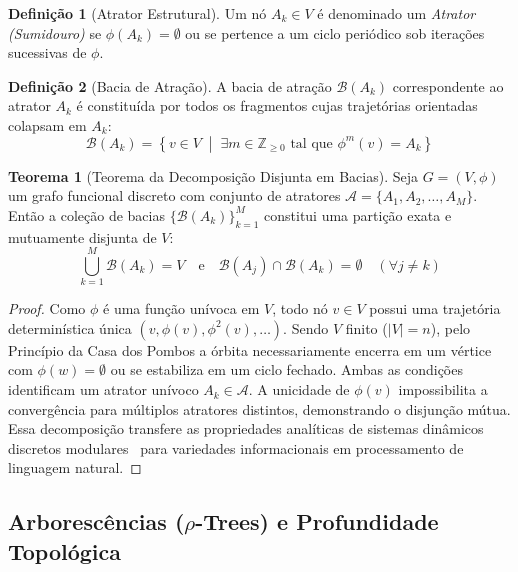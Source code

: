 \documentclass[10pt,twocolumn]{article}
\theoremstyle{definition}
\newtheorem{definition}{Definição}
\newtheorem{theorem}{Teorema}
\begin{document}
\begin{definition}[Atrator Estrutural]
Um nó $A_k \in V$ é denominado um \textit{Atrator (Sumidouro)} se $\phi(A_k) = \emptyset$ ou se pertence a um ciclo periódico sob iterações sucessivas de $\phi$.
\end{definition}

\begin{definition}[Bacia de Atração]
A bacia de atração $\mathcal{B}(A_k)$ correspondente ao atrator $A_k$ é constituída por todos os fragmentos cujas trajetórias orientadas colapsam em $A_k$:
\begin{equation}
\mathcal{B}(A_k) = \left\{ v \in V \;\middle|\; \exists m \in \mathbb{Z}_{\ge 0} \text{ tal que } \phi^m(v) = A_k \right\}
\end{equation}
\end{definition}

\begin{theorem}[Teorema da Decomposição Disjunta em Bacias]
Seja $G = (V, \phi)$ um grafo funcional discreto com conjunto de atratores $\mathcal{A} = \{A_1, A_2, \dots, A_M\}$. Então a coleção de bacias $\{\mathcal{B}(A_k)\}_{k=1}^M$ constitui uma partição exata e mutuamente disjunta de $V$:
\begin{equation}
\bigcup_{k=1}^M \mathcal{B}(A_k) = V \quad \text{e} \quad \mathcal{B}(A_j) \cap \mathcal{B}(A_k) = \emptyset \quad (\forall j \ne k)
\end{equation}
\end{theorem}
\begin{proof}
Como $\phi$ é uma função unívoca em $V$, todo nó $v \in V$ possui uma trajetória determinística única $(v, \phi(v), \phi^2(v), \dots)$. Sendo $V$ finito ($|V| = n$), pelo Princípio da Casa dos Pombos a órbita necessariamente encerra em um vértice com $\phi(w) = \emptyset$ ou se estabiliza em um ciclo fechado. Ambas as condições identificam um atrator unívoco $A_k \in \mathcal{A}$. A unicidade de $\phi(v)$ impossibilita a convergência para múltiplos atratores distintos, demonstrando o disjunção mútua. Essa decomposição transfere as propriedades analíticas de sistemas dinâmicos discretos modulares~\cite{martins2026iterated} para variedades informacionais em processamento de linguagem natural.
\end{proof}

\subsection{Arborescências ($\rho$-Trees) e Profundidade Topológica}
\end{document}
